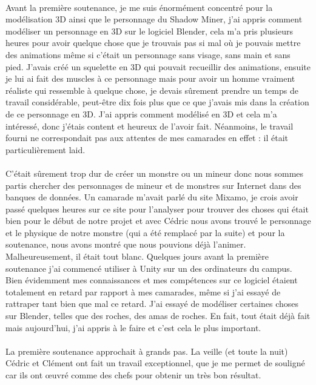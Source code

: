 \documentclass[titlepage, 13px, a4paper]{report}
\begin{document}
\paragraph*{} \hspace{0pt}
Avant la première soutenance, je me suis énormément concentré pour la modélisation 3D ainsi que le personnage 
du Shadow Miner, j’ai appris comment modéliser un personnage en 3D sur le logiciel Blender, 
cela m’a pris plusieurs heures pour avoir quelque chose que je trouvais pas si mal où je pouvais mettre 
des animations même si c’était un personnage sans visage, sans main et sans pied. J’avais créé un squelette 
en 3D qui pouvait recueillir des animations, ensuite je lui ai fait des muscles à ce personnage mais pour 
avoir un homme vraiment réaliste qui ressemble à quelque chose, je devais sûrement prendre un temps de travail 
considérable, peut-être dix fois plus que ce que j’avais mis dans la création de ce personnage en 3D. 
J’ai appris comment modélisé en 3D et cela m’a intéressé, donc j’étais content et heureux de l’avoir fait. 
Néanmoins, le travail fourni ne correspondait pas aux attentes de mes camarades en effet : il était particulièrement 
laid. \\ \\
C’était sûrement trop dur de créer un monstre 
ou un mineur donc nous sommes partis chercher des personnages de mineur et de monstres sur Internet dans des 
banques de données. Un camarade m’avait parlé du site Mixamo, je crois avoir passé quelques heures sur ce site 
pour l’analyser pour trouver des choses qui était bien pour le début de notre projet et avec Cédric nous avons 
trouvé le personnage et le physique de notre monstre (qui a été remplacé par la suite) et pour la soutenance, nous 
avons montré que nous pouvions déjà l’animer. Malheureusement, il était tout blanc. 
Quelques jours avant la première soutenance j’ai commencé utiliser à Unity sur un des ordinateurs du campus. 
Bien évidemment mes connaissances et mes compétences sur ce logiciel étaient totalement en retard par rapport à mes 
camarades, même si j’ai essayé de rattraper tant bien que mal ce retard. J’ai essayé de modéliser certaines 
choses sur Blender, telles que des roches, des amas de roches. En fait, tout était déjà fait mais aujourd’hui, 
j’ai appris à le faire et c’est cela le plus important. \\ \\
La première soutenance approchait à grands pas. 
La veille (et toute la nuit) Cédric et Clément ont fait un travail exceptionnel, que 
je me permet de souligné car ils ont œuvré comme des chefs pour obtenir un très bon résultat. \\
\end{document}
